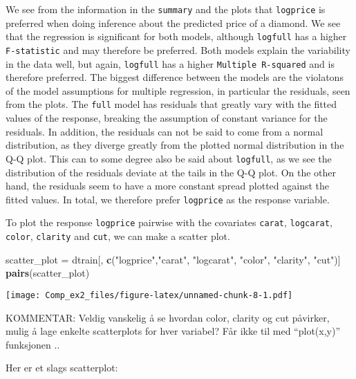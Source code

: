 \documentclass[]{article}
\newenvironment{Shaded}{\begin{snugshade}}{\end{snugshade}}
\newcommand{\KeywordTok}[1]{\textcolor[rgb]{0.13,0.29,0.53}{\textbf{#1}}}
\newcommand{\StringTok}[1]{\textcolor[rgb]{0.31,0.60,0.02}{#1}}
\newcommand{\NormalTok}[1]{#1}
\begin{document}
We see from the information in the \texttt{summary} and the plots that
\texttt{logprice} is preferred when doing inference about the predicted
price of a diamond. We see that the regression is significant for both
models, although \texttt{logfull} has a higher \texttt{F-statistic} and
may therefore be preferred. Both models explain the variability in the
data well, but again, \texttt{logfull} has a higher
\texttt{Multiple\ R-squared} and is therefore preferred. The biggest
difference between the models are the violatons of the model assumptions
for multiple regression, in particular the residuals, seen from the
plots. The \texttt{full} model has residuals that greatly vary with the
fitted values of the response, breaking the assumption of constant
variance for the residuals. In addition, the residuals can not be said
to come from a normal distribution, as they diverge greatly from the
plotted normal distribution in the Q-Q plot. This can to some degree
also be said about \texttt{logfull}, as we see the distribution of the
residuals deviate at the tails in the Q-Q plot. On the other hand, the
residuals seem to have a more constant spread plotted against the fitted
values. In total, we therefore prefer \texttt{logprice} as the response
variable.

To plot the response \texttt{logprice} pairwise with the covariates
\texttt{carat}, \texttt{logcarat}, \texttt{color}, \texttt{clarity} and
\texttt{cut}, we can make a scatter plot.

\begin{Shaded}
\begin{Highlighting}[]
\NormalTok{scatter_plot =}\StringTok{ }\NormalTok{dtrain[, }\KeywordTok{c}\NormalTok{(}\StringTok{"logprice"}\NormalTok{,}\StringTok{"carat"}\NormalTok{, }\StringTok{"logcarat"}\NormalTok{, }\StringTok{"color"}\NormalTok{, }\StringTok{"clarity"}\NormalTok{, }\StringTok{"cut"}\NormalTok{)]}
\KeywordTok{pairs}\NormalTok{(scatter_plot)}
\end{Highlighting}
\end{Shaded}

\texttt{[image: Comp\_ex2\_files/figure-latex/unnamed-chunk-8-1.pdf]}

KOMMENTAR: Veldig vanskelig å se hvordan color, clarity og cut påvirker,
mulig å lage enkelte scatterplots for hver variabel? Får ikke til med
``plot(x,y)'' funksjonen ..

Her er et slags scatterplot:
\end{document}

